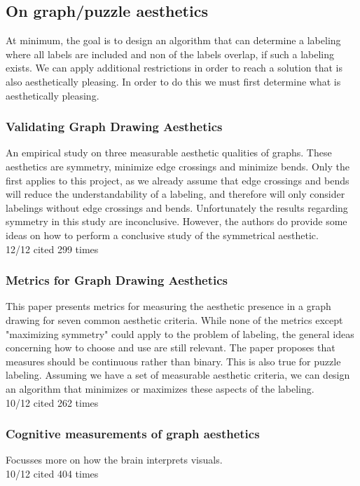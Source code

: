 \documentclass[a4paper]{article}
\begin{document}
\subsection{On graph/puzzle aesthetics}
At minimum, the goal is to design an algorithm that can determine a labeling where all labels are included and non of the labels overlap, if such a labeling exists. We can apply additional restrictions in order to reach a solution that is also aesthetically pleasing. In order to do this we must first determine what is aesthetically pleasing.\\

\subsubsection{Validating Graph Drawing Aesthetics \cite{purchase1995validating}}
An empirical study on three measurable aesthetic qualities of graphs. These aesthetics are symmetry, minimize edge crossings and minimize bends. Only the first applies to this project, as we already assume that edge crossings and bends will reduce the understandability of a labeling, and therefore will only consider labelings without edge crossings and bends. Unfortunately the results regarding symmetry in this study are inconclusive. However, the authors do provide some ideas on how to perform a conclusive study of the symmetrical aesthetic.\\
12/12 cited 299 times
\subsubsection{Metrics for Graph Drawing Aesthetics \cite{purchase2002metrics}}
This paper presents metrics for measuring the aesthetic presence in a graph drawing for seven common aesthetic criteria. While none of the metrics except "maximizing symmetry" could apply to the problem of labeling, the general ideas concerning how to choose and use are still relevant. The paper proposes that measures should be continuous rather than binary. This is also true for puzzle labeling. Assuming we have a set of measurable aesthetic criteria, we can design an algorithm that minimizes or maximizes these aspects of the labeling.\\
10/12 cited 262 times

\subsubsection{Cognitive measurements of graph aesthetics \cite{ware2002cognitive}}
Focusses more on how the brain interprets visuals. \\
10/12 cited 404 times
\end{document}
